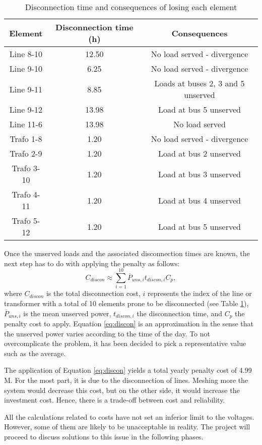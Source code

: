\begin{table}[!htb]\centering
  \begin{tabular}[]{ccc}
    \hline 
    \textbf{Element} & \textbf{Disconnection time (h)} & \textbf{Consequences} \\
    \hline
    Line 8-10 & 12.50 & No load served - divergence \\
    Line 9-10 & 6.25 & No load served - divergence \\
    Line 9-11 & 8.85 & Loads at buses 2, 3 and 5 unserved \\
    Line 9-12 & 13.98 & Load at bus 5 unserved \\
    Line 11-6 & 13.98 & No load served \\
    Trafo 1-8 & 1.20 & No load served - divergence \\
    Trafo 2-9 & 1.20 & Load at bus 2 unserved \\
    Trafo 3-10 & 1.20 & Load at bus 3 unserved \\
    Trafo 4-11 & 1.20 & Load at bus 4 unserved \\
    Trafo 5-12 & 1.20 & Load at bus 5 unserved \\
    \hline
  \end{tabular}
  \caption{Disconnection time and consequences of losing each element}
  \label{tab:lt1}
\end{table}
Once the unserved loads and the associated disconnection times are known, the next step has to do with applying the penalty as follows:
\begin{equation}
  C_{discon} \approx \sum_{i=1}^{10} \overline{P}_{uns,i} t_{discon,i} C_p,
  \label{eq:discon}
\end{equation}
where $C_{discon}$ is the total disconnection cost, $i$ represents the index of the line or transformer with a total of 10 elements prone to be disconnected (see Table \ref{tab:lt1}), $\overline{P}_{uns,i}$ is the mean unserved power, $t_{discon,i}$ the disconnection time, and $C_p$ the penalty cost to apply. Equation \ref{eq:discon} is an approximation in the sense that the unserved power varies according to the time of the day. To not overcomplicate the problem, it has been decided to pick a representative value such as the average. 

The application of Equation \ref{eq:discon} yields a total yearly penalty cost of 4.99 M\texteuro. For the most part, it is due to the disconnection of lines. Meshing more the system would decrease this cost, but on the other side, it would increase the investment cost. Hence, there is a trade-off between cost and reliability.

All the calculations related to costs have not set an inferior limit to the voltages. However, some of them are likely to be unacceptable in reality. The project will proceed to discuss solutions to this issue in the following phases. 